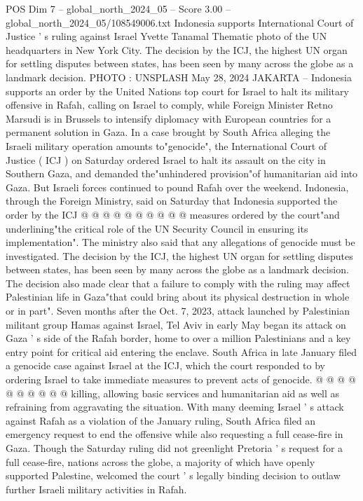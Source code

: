 \begin{textsample}{POS Dim 7 – global\_north\_2024\_05 – Score 3.00 – global\_north\_2024\_05/108549006.txt}  \label{ex:f7_pos_268}
Indonesia supports International Court of Justice ' s ruling against Israel Yvette Tanamal Thematic photo of the UN headquarters in New York City.
The decision by the ICJ, the highest UN organ for settling disputes between states, has been seen by many across the globe as a landmark decision.
PHOTO : UNSPLASH May 28, 2024 JAKARTA -- Indonesia supports an order by the United Nations top court for Israel to halt its military offensive in Rafah, calling on Israel to comply, while Foreign Minister Retno Marsudi is in Brussels to intensify diplomacy with European countries for a permanent solution in Gaza.
In a case brought by South Africa alleging the Israeli military operation amounts to"genocide", the International Court of Justice ( ICJ ) on Saturday ordered Israel to halt its assault on the city in Southern Gaza, and demanded the"unhindered provision"of humanitarian aid into Gaza.
But Israeli forces continued to pound Rafah over the weekend.
Indonesia, through the Foreign Ministry, said on Saturday that Indonesia supported the order by the ICJ @ @ @ @ @ @ @ @ @ @ measures ordered by the court"and underlining"the critical role of the UN Security Council in ensuring its implementation".
The ministry also said that any allegations of genocide must be investigated.
The decision by the ICJ, the highest UN organ for settling disputes between states, has been seen by many across the globe as a landmark decision.
The decision also made clear that a failure to comply with the ruling may affect Palestinian life in Gaza"that could bring about its physical destruction in whole or in part".
Seven months after the Oct. 7, 2023, attack launched by Palestinian militant group Hamas against Israel, Tel Aviv in early May began its attack on Gaza ' s side of the Rafah border, home to over a million Palestinians and a key entry point for critical aid entering the enclave.
South Africa in late January filed a genocide case against Israel at the ICJ, which the court responded to by ordering Israel to take immediate measures to prevent acts of genocide. @ @ @ @ @ @ @ @ @ @ killing, allowing basic services and humanitarian aid as well as refraining from aggravating the situation.
With many deeming Israel ' s attack against Rafah as a violation of the January ruling, South Africa filed an emergency request to end the offensive while also requesting a full cease-fire in Gaza.
Though the Saturday ruling did not greenlight Pretoria ' s request for a full cease-fire, nations across the globe, a majority of which have openly supported Palestine, welcomed the court ' s legally binding decision to outlaw further Israeli military activities in Rafah.

\end{textsample}
